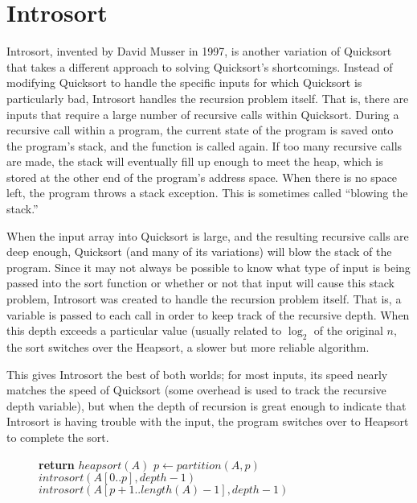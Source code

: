 \documentclass{article}
\begin{document}
\pagebreak
\section{Introsort}
Introsort, invented by David Musser in 1997,  is another variation of Quicksort that takes a different 
approach to solving Quicksort's
shortcomings. Instead of modifying Quicksort to handle the specific inputs for which Quicksort
is particularly bad, Introsort handles the recursion problem itself. That is, there are inputs that
require a large number of recursive calls within Quicksort. During a recursive call within a 
program, the current state of the program is
saved onto the program's stack, and the function is called again. If too many recursive calls are
made, the stack will eventually fill up enough to meet the heap, which is stored at the other end
of the program's address space. When there is no space left, the program throws a stack
exception. This is sometimes called ``blowing the stack.''

When the input array into Quicksort is large, and the resulting recursive calls are deep enough,
Quicksort (and many of its variations) will blow the stack of the program. Since it may not always
be possible to know what type of input is being passed into the sort function or whether or
not that input will cause this stack problem, Introsort was created to handle the recursion problem
itself.
That is, a variable is passed to each call in order to keep track of the recursive depth. When
this depth exceeds a particular value (usually related to $\log_2$ of the original $n$, the sort 
switches over the Heapsort, a slower but more reliable algorithm.

This gives Introsort the best of both worlds; for most inputs, its speed nearly matches the
speed of Quicksort (some overhead is used to track the recursive depth variable), but when
the depth of recursion is great enough to indicate that Introsort is having trouble with the
input, the program switches over to Heapsort to complete the sort.

\begin{figure}
\begin{algorithmic}
			\State \textbf{return}
		\EndIf
			\State $heapsort(A)$
		\Else
			\State $p \gets partition(A,p)$
			\State $introsort(A[0..p], depth - 1)$
			\State $introsort(A[p+1..length(A) - 1], depth - 1)$
		\EndIf
	\EndProcedure
\end{algorithmic}
\end{figure}
\end{document}
